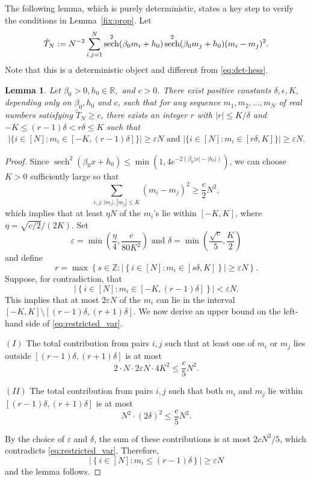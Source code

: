 \documentclass[letterpaper,11pt,reqno]{amsart}
\newtheorem{lem}[thm]{Lemma}
\renewcommand{\le}{\leqslant}
\renewcommand{\ge}{\geqslant}
\newcommand{\eps}{\varepsilon}
\DeclareMathOperator{\sech}{sech}
\begin{document}
The following lemma, which is purely deterministic, states a key step to verify the conditions in Lemma~\ref{fix:prop}. Let \[
\tilde{T}_N := N^{-2} \sum_{i,j=1}^N \sech^2(\gb_0m_i +h_0)\sech^2(\gb_0m_j +h_0)(m_i-m_j)^2.
\]
Note that this is a deterministic object and different from \eqref{eq:det-hess}.
\begin{lem}\label{fix:lem1}
    Let $\beta_0>0,h_0 \in \mathbb{R},$ and $c>0$. There exist positive constants $\delta,\epsilon,K$,  depending only on $\beta_0, h_0$ and $c$, such that for any sequence $m_1, m_2, \ldots, m_N$ of real numbers satisfying $\tilde{T}_N \ge c$,
    there exists an integer $r$ with $|r| \le K/ \delta$ and $
    -K \le (r-1) \delta < r \delta \le K$ such that 
    \begin{align}\label{fix:eq3} |\{i \in [N]: m_i \in  [-K,  (r-1)\delta]  \}|  \ge \eps N \text{ and } |\{i \in [N]: m_i \in  [  r \delta, K ]  \}|  \ge \eps N.
    	\end{align}
\end{lem}
\begin{proof}
    Since $\sech^2(\beta_0 x + h_0) \le \min(1, 4 e^{-2 (\beta_0 |x| - |h_0|)})$, we can choose $K > 0$ sufficiently large so that
    \begin{equation} \label{eq:restricted_var}
        \sum_{i,j: |m_i|, |m_j| \le K } (m_i - m_j)^2 \ge \frac{c}{2} N^2,
    \end{equation}
    which implies that at least $\eta N$ of the $m_i$'s lie within $[-K, K]$, where $\eta = \sqrt{c/2} / (2K)$. Set
    \[
    \eps = \min \left( \frac{\eta}{4}, \frac{c}{80 K^2} \right)\,\, \text{and} \,\, \delta = \min \left( \frac{\sqrt{c}}{5}, \frac{K}{2} \right)
    \]
    and define
    \[
    r = \max \left\{ s \in \mathbb{Z} : \left| \left\{ i \in [N] : m_i \in [s \delta, K] \right\} \right| \ge \eps N \right\}.
    \]
    Suppose, for contradiction, that
    \[
    \left| \left\{ i \in [N] : m_i \in [-K, (r - 1)\delta] \right\} \right| < \eps N.
    \]
    This implies that at most $2\eps N$ of the $m_i$ can lie in the interval $[-K, K] \setminus [(r-1)\delta, (r+1)\delta]$. We now derive an upper bound on the left-hand side of \eqref{eq:restricted_var}.

    \medskip
    \noindent
  $(I)$ The total contribution from pairs $i, j$ such that at least one of $m_i$ or $m_j$ lies outside $[(r-1)\delta, (r+1)\delta]$ is at most
    \[
    2 \cdot N \cdot 2\eps N \cdot 4K^2 \le \frac{c}{5} N^2.
    \]

    \medskip
    \noindent
    $(II)$ The total contribution from pairs $i, j$ such that both $m_i$ and $m_j$ lie within $[(r-1)\delta, (r+1)\delta]$ is at most
    \[
    N^2 \cdot (2\delta)^2 \le \frac{c}{5} N^2.
    \]

    \medskip
    \noindent
    By the choice of $\eps$ and $\delta$, the sum of these contributions is at most $2c N^2/5$, which contradicts \eqref{eq:restricted_var}. Therefore,
    \[
    \left| \left\{ i \in [N] : m_i \le (r - 1)\delta \right\} \right| \ge \eps N
    \]
    and the lemma follows.
\end{proof}
\end{document}
